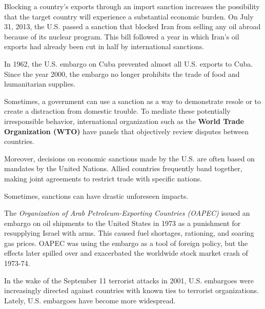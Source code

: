 \documentclass{article}
\begin{document}
  \begin{example}
    Blocking a country's exports through an import sanction increases the possibility that the target country will experience a substantial economic burden. On July 31, 2013, the U.S. passed a sanction that blocked Iran from selling any oil abroad because of its nuclear program. This bill followed a year in which Iran's oil exports had already been cut in half by international sanctions. 
  \end{example}

  \begin{example}
    In 1962, the U.S. embargo on Cuba prevented almost all U.S. exports to Cuba. Since the year 2000, the embargo no longer prohibits the trade of food and humanitarian supplies. 
  \end{example}

  \begin{definition}[WTO]
    Sometimes, a government can use a sanction as a way to demonstrate resole or to create a distraction from domestic trouble. To mediate these potentially irresponsible behavior, international organization such as the \textbf{World Trade Organization (WTO)} have panels that objectively review disputes between countries. 

    Moreover, decisions on economic sanctions made by the U.S. are often based on mandates by the United Nations. Allied countries frequently band together, making joint agreements to restrict trade with specific nations. 
  \end{definition}

  Sometimes, sanctions can have drastic unforeseen impacts. 

  \begin{example}
    The \textit{Organization of Arab Petroleum-Exporting Countries (OAPEC)} issued an embargo on oil shipments to the United States in 1973 as a punishment for resupplying Israel with arms. This caused fuel shortages, rationing, and soaring gas prices. OAPEC was using the embargo as a tool of foreign policy, but the effects later spilled over and exacerbated the worldwide stock market crash of 1973-74. 
  \end{example}

  \begin{example}
    In the wake of the September 11 terrorist attacks in 2001, U.S. embargoes were increasingly directed against countries with known ties to terrorist organizations. Lately, U.S. embargoes have become more widespread. 
  \end{example}
\end{document}
